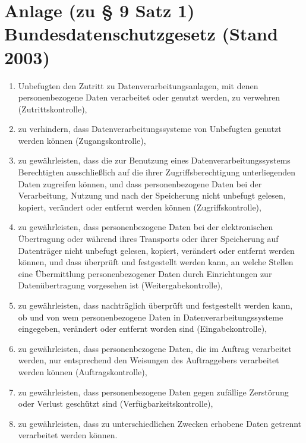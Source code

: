 \section{Anlage (zu § 9 Satz 1) Bundesdatenschutzgesetz (Stand 2003)}
\begin{enumerate} %
\item Unbefugten den Zutritt zu Datenverarbeitungsanlagen, mit denen personenbezogene Daten verarbeitet oder genutzt werden, zu verwehren (Zutrittskontrolle),
\item zu verhindern, dass Datenverarbeitungssysteme von Unbefugten genutzt werden können (Zugangskontrolle),
\item zu gewährleisten, dass die zur Benutzung eines Datenverarbeitungssystems Berechtigten ausschließlich auf die ihrer Zugriffsberechtigung unterliegenden Daten zugreifen können, und dass personenbezogene Daten bei der Verarbeitung, Nutzung und nach der Speicherung nicht unbefugt gelesen, kopiert, verändert oder entfernt werden können (Zugriffskontrolle),
\item zu gewährleisten, dass personenbezogene Daten bei der elektronischen Übertragung oder während ihres Transports oder ihrer Speicherung auf Datenträger nicht unbefugt gelesen, kopiert, verändert oder entfernt werden können, und dass überprüft und festgestellt werden kann, an welche Stellen eine Übermittlung personenbezogener Daten durch Einrichtungen zur Datenübertragung vorgesehen ist (Weitergabekontrolle),
\item zu gewährleisten, dass nachträglich überprüft und festgestellt werden kann, ob und von wem personenbezogene Daten in Datenverarbeitungssysteme eingegeben, verändert oder entfernt worden sind (Eingabekontrolle),
\item zu gewährleisten, dass personenbezogene Daten, die im Auftrag verarbeitet werden, nur entsprechend den Weisungen des Auftraggebers verarbeitet werden können (Auftragskontrolle),
\item zu gewährleisten, dass personenbezogene Daten gegen zufällige Zerstörung oder Verlust geschützt sind (Verfügbarkeitskontrolle),
\item zu gewährleisten, dass zu unterschiedlichen Zwecken erhobene Daten getrennt verarbeitet werden können.
\end{enumerate}